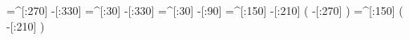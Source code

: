    =^[:270]%
     -[:330]%
     =^[:30]%
     -[:330]%
     =^[:30]%
      -[:90]%
    =^[:150]%
     -[:210]%
               (
         -[:270]%
               )
    =^[:150]%
               (
         -[:210]%
               )